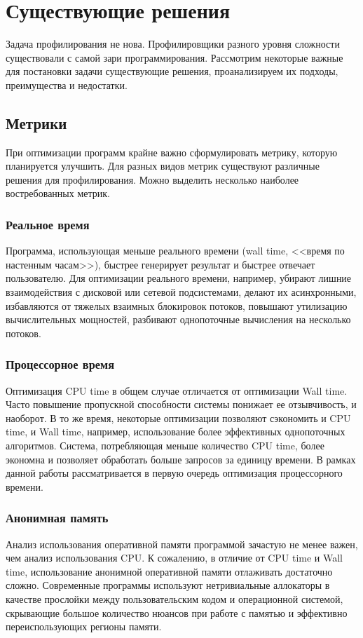 \section{Существующие решения}
Задача профилирования не нова.
Профилировщики разного уровня сложности существовали с самой зари программирования.
Рассмотрим некоторые важные для постановки задачи существующие решения, проанализируем их подходы, преимущества и недостатки.

\subsection{Метрики}
При оптимизации программ крайне важно сформулировать метрику, которую планируется улучшить.
Для разных видов метрик существуют различные решения для профилирования.
Можно выделить несколько наиболее востребованных метрик.

\subsubsection{Реальное время}
Программа, использующая меньше реального времени (wall time, <<время по настенным часам>>),
быстрее генерирует результат и быстрее отвечает пользователю.
Для оптимизации реального времени, например, убирают лишние взаимодействия с дисковой или сетевой подсистемами,
делают их асинхронными, избавляются от тяжелых взаимных блокировок потоков,
повышают утилизацию вычислительных мощностей, разбивают однопоточные вычисления на несколько потоков.

\subsubsection{Процессорное время}
Оптимизация CPU time в общем случае отличается от оптимизации Wall time.
Часто повышение пропускной способности системы понижает ее отзывчивость, и наоборот.
В то же время, некоторые оптимизации позволяют сэкономить и CPU time, и Wall time, например, использование более эффективных однопоточных алгоритмов.
Система, потребляющая меньше количество CPU time, более экономна и позволяет обработать больше запросов за единицу времени.
В рамках данной работы рассматривается в первую очередь оптимизация процессорного времени.

\subsubsection{Анонимная память}
Анализ использования оперативной памяти программой зачастую не менее важен, чем анализ использования CPU.
К сожалению, в отличие от CPU time и Wall time, использование анонимной оперативной памяти
отлаживать достаточно сложно. Современные программы используют нетривиальные аллокаторы
в качестве прослойки между пользовательским кодом и операционной системой, скрывающие большое
количество нюансов при работе с памятью и эффективно переиспользующих регионы памяти.

